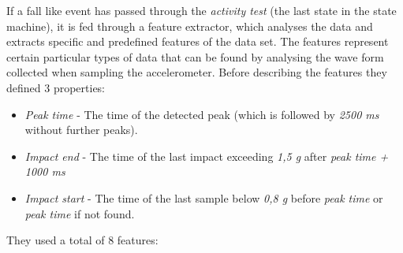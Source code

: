 \documentclass[12pt, a4paper, onecolumn]{article}
\begin{document}
	
	
	If a fall like event has passed through the  \textit{activity test} (the last state in the state machine), it is fed through a feature extractor, which analyses the data and extracts specific and predefined features of the data set. The features represent certain particular types of data that can be found by analysing the wave form collected when sampling the accelerometer. Before describing the features they defined 3 properties:
	\begin{itemize}
		\item \textit{Peak time} - The time of the detected peak (which is followed by \textit{2500 ms} without further peaks).
		\item \textit{Impact end} - The time of the last impact exceeding \textit{1,5 g} after \textit{peak time + 1000 ms}
		\item  \textit{Impact start} - The time of the last sample below \textit{0,8 g} before \textit{peak time} or \textit{peak time} if not found. 
	\end{itemize}
	They used a total of 8 features:
	
\end{document}

